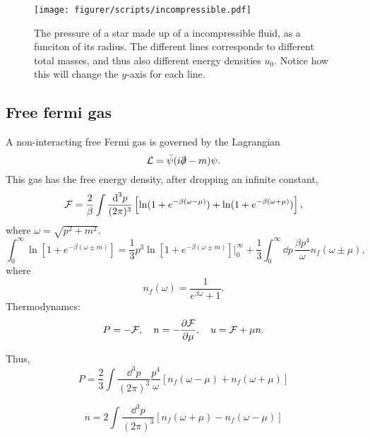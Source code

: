 \begin{figure}
    \centering
    \texttt{[image: figurer/scripts/incompressible.pdf]}
    \caption{The pressure of a star made up of a incompressible fluid, as a funciton of its radius. The different lines corresponds to different total masses, and thus also different energy densities $u_0$. Notice how this will change the $y$-axis for each line.}
    \label{fig: pressure incompressible fluid}
\end{figure}

\subsection*{Free fermi gas}

A non-interacting free Fermi gas is governed by the Lagrangian
%
\begin{equation}
    \mathcal{L} = \bar \psi (i \slashed \partial - m) \psi.
\end{equation}
%
This gas has the free energy density, after dropping an infinite constant, 
%
\begin{equation}
    \mathcal{F} = \frac{2}{\beta}\int \frac{\text{d}^3 p}{(2 \pi)^3} \left[
        \ln(1 + e^{-\beta(\omega - \mu)})
        + 
        \ln(1 + e^{-\beta(\omega + \mu)})
    \right],
\end{equation}
%
where $\omega = \sqrt{p^2 + m^2}$.
%
\begin{equation}
    \int_0^\infty \ln\left[1 + e^{-\beta(\omega \pm m)}\right]
    = 
    \frac{1}{3} p^3\ln\left[1 + e^{-\beta(\omega \pm m)}\right] \bigg |_0^\infty
    + \frac{1}{3} \int_0^\infty \dd p \, \frac{ \beta p^4}{\omega}n_f(\omega \pm \mu),
\end{equation}
%
where
%
\begin{equation}
    n_f(\omega) = \frac{1}{e^{\beta \omega}+1}.
\end{equation}
%
Thermodynamcs:
%
\begin{equation}
    P = - \Eff, \quad n = - \diffp{\Eff}{\mu}, \quad u = \Eff + \mu n.
\end{equation}
%

Thus,
%
\begin{equation}
    P = \frac{2}{3}\int \frac{\dd^3 p}{(2 \pi)^3} 
    \frac{p^4}{\omega}
    [n_f(\omega - \mu) + n_f(\omega + \mu)]
\end{equation}
%

%
\begin{equation}
    n = 2 \int \frac{\dd^3 p}{(2 \pi)^3}
    \left[
        n_f(\omega + \mu)
        -
        n_f(\omega - \mu)
    \right]
\end{equation}
%

